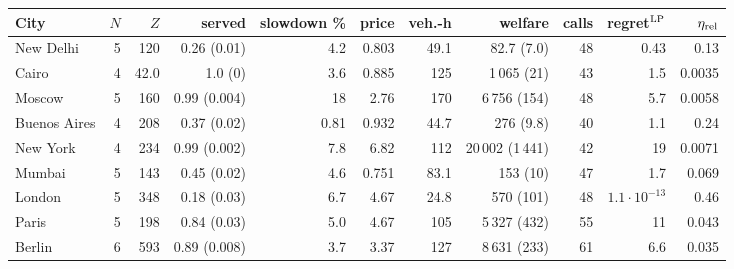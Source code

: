 \begin{tabular}{lrrrrrrrrrr}
\toprule
City & $N$ & $Z$ & served & slowdown \% & price & veh.-h & welfare & calls & regret$^{\rm LP}$ & $\eta_{\rm rel}$ \\
\midrule
New Delhi & 5 & 120 & 0.26 (0.01) & 4.2 & 0.803 & 49.1 & 82.7 (7.0) & 48 & 0.43 & 0.13 \\
Cairo & 4 & 42.0 & 1.0 (0) & 3.6 & 0.885 & 125 & 1\,065 (21) & 43 & 1.5 & 0.0035 \\
Moscow & 5 & 160 & 0.99 (0.004) & 18 & 2.76 & 170 & 6\,756 (154) & 48 & 5.7 & 0.0058 \\
Buenos Aires & 4 & 208 & 0.37 (0.02) & 0.81 & 0.932 & 44.7 & 276 (9.8) & 40 & 1.1 & 0.24 \\
New York & 4 & 234 & 0.99 (0.002) & 7.8 & 6.82 & 112 & 20\,002 (1\,441) & 42 & 19 & 0.0071 \\
Mumbai & 5 & 143 & 0.45 (0.02) & 4.6 & 0.751 & 83.1 & 153 (10) & 47 & 1.7 & 0.069 \\
London & 5 & 348 & 0.18 (0.03) & 6.7 & 4.67 & 24.8 & 570 (101) & 48 & $1.1\cdot10^{-13}$ & 0.46 \\
Paris & 5 & 198 & 0.84 (0.03) & 5.0 & 4.67 & 105 & 5\,327 (432) & 55 & 11 & 0.043 \\
Berlin & 6 & 593 & 0.89 (0.008) & 3.7 & 3.37 & 127 & 8\,631 (233) & 61 & 6.6 & 0.035 \\
\bottomrule
\end{tabular}
